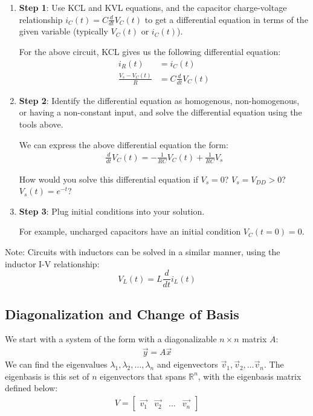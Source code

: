 \begin{enumerate}
    \item \textbf{Step 1}: Use KCL and KVL equations, and the capacitor charge-voltage relationship $i_C(t) = C \frac{d}{dt} V_C(t)$ to get a differential equation in terms of the given variable (typically $V_C(t)$ or $i_C(t)$).
    
    For the above circuit, KCL gives us the following differential equation:
    \begin{align*}
        i_R(t) &= i_C(t) \\
        \frac{V_s - V_C(t)}{R} &= C \frac{d}{dt} V_C(t)
    \end{align*}

    \item \textbf{Step 2}: Identify the differential equation as homogenous, non-homogenous, or having a non-constant input, and solve the differential equation using the tools above.

    We can express the above differential equation the form:
    \begin{align*}
        \frac{d}{dt} V_C(t) = -\frac{1}{RC} V_C(t) + \frac{1}{RC} V_s
    \end{align*}

    How would you solve this differential equation if $V_s = 0$? $V_s = V_{DD} > 0$? $V_s(t) = e^{-t}$?

    \item \textbf{Step 3}: Plug initial conditions into your solution.

    For example, uncharged capacitors have an initial condition $V_C(t = 0) = 0$.
\end{enumerate}

Note: Circuits with inductors can be solved in a similar manner, using the inductor I-V relationship: 
$$\boxed{V_L(t) = L \frac{d}{dt} i_L(t)}$$

\newpage
\subsection*{Diagonalization and Change of Basis}

We start with a system of the form with a diagonalizable $n \times n$ matrix $A$:
\begin{align*}
    \vec{y} = A \vec{x}
\end{align*}
We can find the eigenvalues $\lambda_1, \lambda_2, \ldots, \lambda_n$ and eigenvectors $\vec{v}_1, \vec{v}_2, \ldots \vec{v}_n$. The eigenbasis is this set of $n$ eigenvectors that spans $\mathbb{R}^n$, with the eigenbasis matrix defined below:
\begin{align*}
    V = \begin{bmatrix}
        \vec{v_1} & \vec{v_2} & \dots & \vec{v_n}
    \end{bmatrix}
\end{align*}

